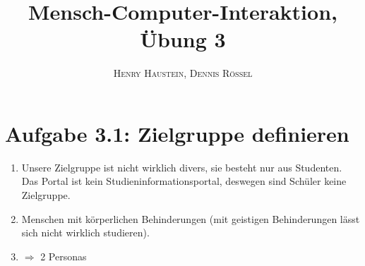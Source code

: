 \documentclass{article}
\title{\textbf{Mensch-Computer-Interaktion, Übung 3}}
\author{\textsc{Henry Haustein}, \textsc{Dennis Rössel}}
\date{}
\begin{document}
	\maketitle
	
	\section*{Aufgabe 3.1: Zielgruppe definieren}
	\begin{enumerate}[label=(\alph*)]
		\item Unsere Zielgruppe ist nicht wirklich divers, sie besteht nur aus Studenten. Das Portal ist kein Studieninformationsportal, deswegen sind Schüler keine Zielgruppe.
		\item Menschen mit körperlichen Behinderungen (mit geistigen Behinderungen lässt sich nicht wirklich studieren).
		\item $\Rightarrow$ 2 Personas
	\end{enumerate}
\end{document}
